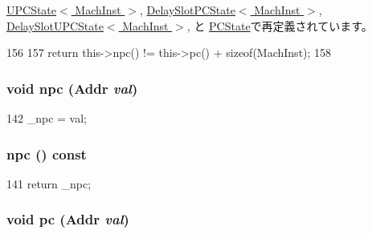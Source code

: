\hyperlink{classGenericISA_1_1UPCState_ae3f0eb15a9382eefff6b00cf7999c2e3}{UPCState$<$ MachInst $>$}, \hyperlink{classGenericISA_1_1DelaySlotPCState_ae3f0eb15a9382eefff6b00cf7999c2e3}{DelaySlotPCState$<$ MachInst $>$}, \hyperlink{classGenericISA_1_1DelaySlotUPCState_ae3f0eb15a9382eefff6b00cf7999c2e3}{DelaySlotUPCState$<$ MachInst $>$}, と \hyperlink{classX86ISA_1_1PCState_ae3f0eb15a9382eefff6b00cf7999c2e3}{PCState}で再定義されています。


\begin{DoxyCode}
156     {
157         return this->npc() != this->pc() + sizeof(MachInst);
158     }
\end{DoxyCode}
\hypertarget{classGenericISA_1_1SimplePCState_aa18dbf528ad5e6696b84d1f5a7cab71b}{
\subsubsection[{npc}]{\setlength{\rightskip}{0pt plus 5cm}void npc ({\bf Addr} {\em val})}}
\label{classGenericISA_1_1SimplePCState_aa18dbf528ad5e6696b84d1f5a7cab71b}



\begin{DoxyCode}
142 { _npc = val; }
\end{DoxyCode}
\hypertarget{classGenericISA_1_1SimplePCState_ae606c6164a927e305006d93c7fe0b0bd}{
\subsubsection[{npc}]{ npc () const}}
\label{classGenericISA_1_1SimplePCState_ae606c6164a927e305006d93c7fe0b0bd}



\begin{DoxyCode}
141 { return _npc; }
\end{DoxyCode}
\hypertarget{classGenericISA_1_1SimplePCState_a890f32c7e075e8c64c1c50252b1be15e}{
\subsubsection[{pc}]{\setlength{\rightskip}{0pt plus 5cm}void pc ({\bf Addr} {\em val})}}
\label{classGenericISA_1_1SimplePCState_a890f32c7e075e8c64c1c50252b1be15e}



